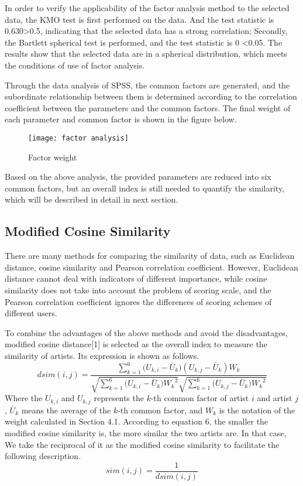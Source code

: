 \documentclass{mcmthesis}
\begin{document}
In order to verify the applicability of the factor analysis method to the selected data, the KMO test is first performed on the data. And the test statistic is 0.630>0.5, indicating that the selected data has a strong correlation; Secondly, the Bartlett spherical test is performed, and the test statistic is 0 <0.05. The results show that the selected data are in a spherical distribution, which meets the conditions of use of factor analysis.

Through the data analysis of SPSS, the common factors are generated, and the subordinate relationship between them is determined according to the correlation coefficient between the parameters and the common factors. The final weight of each parameter and common factor is shown in the figure below.
\begin{figure}[H]%
	\small
	\centering
	\texttt{[image: factor analysis]}%
	\caption{Factor weight}\label{fig:7}%
\end{figure}
Based on the above analysis, the provided parameters are reduced into six common factors, but an overall index is still needed to quantify the similarity, which will be described in detail in next section.
\subsection{Modified Cosine Similarity}
There are many methods for comparing the similarity of data, such as Euclidean distance, cosine similarity and Pearson correlation coefficient. However, Euclidean distance cannot deal with indicators of different importance, while cosine similarity does not take into account the problem of scoring scale, and the Pearson correlation coefficient ignores the differences of scoring schemes of different users.

To combine the advantages of the above methods and avoid the disadvantages, modified cosine distance[1] is selected as the overall index to measure the similarity of artists. Its expression is shown as follows.
\begin{equation}
dsim(i,j) = \frac{{\sum\nolimits_{k = 1}^6 {({U_{k,i}} - } {{\bar U}_k})({U_{k,j}} - {{\bar U}_k}){W_k}}}{{\sqrt {\sum\nolimits_{k = 1}^6 {({U_{k,i}} - } {{\bar U}_k}){W_k}^2} \sqrt {\sum\nolimits_{k = 1}^6 {({U_{k,j}} - } {{\bar U}_k}){W_k}^2} }}
\end{equation}
Where the ${{U_{k,i}}}$ and ${{U_{k,j}}}$ represents the $k$-th common factor of artist $i$ and artist $j$, ${{{\bar U}_k}}$ means the average of the $k$-th common factor, and ${{W_k}}$
is the notation of the weight calculated in Section 4.1. According to equation 6, the smaller the modified cosine similarity is, the more similar the two artists are. In that case, We take the reciprocal of it as the modified cosine similarity to facilitate the following description.
\begin{equation}
sim(i,j) = \frac{1}{{dsim(i,j)}}
\end{equation}
\end{document}
